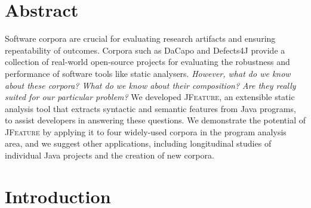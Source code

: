 

\section{Abstract}
Software corpora are crucial for evaluating research artifacts and ensuring repeatability of outcomes. Corpora such as DaCapo and Defects4J provide
a collection of real-world open-source  projects for evaluating the robustness and performance of software tools like static analysers.
\emph{However, what do we know about these corpora? What do we know about their composition? Are they really suited for our particular problem?}
We developed \textsc{JFeature}, an extensible static analysis tool that extracts syntactic and semantic features from Java programs, to assist developers in answering these questions.
We demonstrate the potential of  \textsc{JFeature} by applying it to four widely-used corpora in the program analysis area, and we suggest other applications, including
 longitudinal studies of individual Java projects and the creation of new corpora.






\section{Introduction}
\label{sec:introduction}


